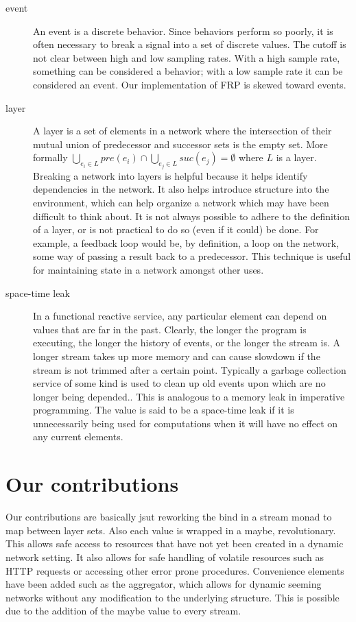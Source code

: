 \documentclass[twocolumn]{paper}
\begin{document}
\begin{description}
\item[event] An event is a discrete behavior. Since behaviors perform so poorly, it is often necessary to break a signal into a set of discrete values. The cutoff is not clear between high and low sampling rates. With a high sample rate, something can be considered a behavior; with a low sample rate it can be considered an event. Our implementation of FRP is skewed toward events.

\item[layer] A layer is a set of elements in a network where the intersection of their mutual union of predecessor and successor sets is the empty set. More formally $\bigcup_{e_i \in L}{pre(e_i)} \cap \bigcup_{e_j \in L}{suc(e_j)} = \emptyset$ where $L$ is a layer. Breaking a network into layers is helpful because it helps identify dependencies in the network. It also helps introduce structure into the environment, which can help organize a network which may have been difficult to think about. It is not always possible to adhere to the definition of a layer, or is not practical to do so (even if it could) be done. For example, a feedback loop would be, by definition, a loop on the network, some way of passing a result back to a predecessor. This technique is useful for maintaining state in a network amongst other uses.


\item[space-time leak] In a functional reactive service, any particular element can depend on values that are far in the past. Clearly, the longer the program is executing, the longer the history of events, or the longer the stream is. A longer stream takes up more memory and can cause slowdown if the stream is not trimmed after a certain point. Typically a garbage collection service of some kind is used to clean up old events upon which are no longer being depended.. This is analogous to a memory leak in imperative programming. The value is said to be a space-time leak if it is unnecessarily being used for computations when it will have no effect on any current elements.
\end{description}


\section{Our contributions}
Our contributions are basically jsut reworking the bind in a stream monad to map between layer sets. Also each value is wrapped in a maybe, revolutionary. This allows safe access to resources that have not yet been created in a dynamic network setting. It also allows for safe handling of volatile resources such as HTTP requests or accessing other error prone procedures. Convenience elements have been added such as the aggregator, which allows for dynamic seeming networks without any modification to the underlying structure. This is possible due to the addition of the maybe value to every stream.
\end{document}
